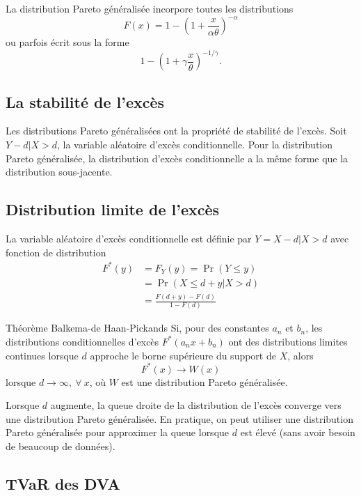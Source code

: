 La distribution Pareto généralisée incorpore toutes les distributions 
$$F(x) = 1 - \left(1 + \frac{x}{\alpha \theta}\right)^{-\alpha}$$
ou parfois écrit sous la forme 
$$1 - \left(1 + \gamma \frac{x}{\theta}\right)^{-1/\gamma}.$$

\subsection{La stabilité de l'excès}

Les distributions Pareto généralisées ont la propriété de stabilité de l'excès. Soit $Y - d \vert X > d$, la variable aléatoire d'excès conditionnelle. Pour la distribution Pareto généralisée, la distribution d'excès conditionnelle  a la même forme que la distribution sous-jacente. 

\subsection{Distribution limite de l'excès}

La variable aléatoire d'excès conditionnelle est définie par $Y = X-d \vert X > d$ avec fonction de distribution 
\begin{align*}
F^* (y) &= F_Y(y) = \Pr(Y \leq y)\\
&= \Pr(X \leq d + y \vert X > d)\\
&= \frac{F(d + y) - F(d)}{1 - F(d)}
\end{align*}

\begin{theoreme}{Théorème Balkema-de Haan-Pickands}{}
	Si, pour des constantes $a_n$ et $b_n$, les distributions conditionnelles d'excès $F^*(a_n x + b_n)$ ont des distributions limites continues lorsque $d$ approche le borne supérieure du support de $X$, alors $$F^*(x) \to W(x)$$ lorsque $d \to \infty, ~\forall~ x$, où $W$ est une distribution Pareto généralisée. 
\end{theoreme}

Lorsque $d$ augmente, la queue droite de la distribution de l'excès converge vers une distribution Pareto généralisée. En pratique, on peut utiliser une distribution Pareto généralisée pour approximer la queue lorsque $d$ est élevé (sans avoir besoin de beaucoup de données). 

\subsection{TVaR des DVA}

